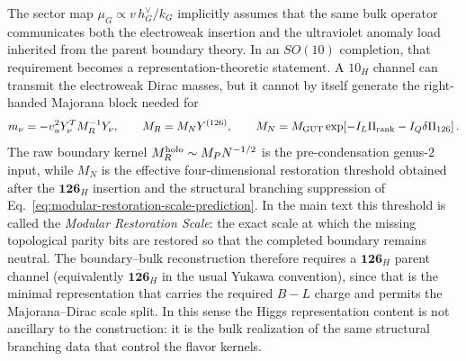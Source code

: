 \documentclass[11pt]{article}
\begin{document}
The sector map $\mu_G\propto v\,h_G^{\vee}/k_G$ implicitly assumes that the same bulk operator communicates both the electroweak insertion and the ultraviolet anomaly load inherited from the parent boundary theory. In an $SO(10)$ completion, that requirement becomes a representation-theoretic statement. A $10_H$ channel can transmit the electroweak Dirac masses, but it cannot by itself generate the right-handed Majorana block needed for
\begin{equation}
 m_{\nu}=-v_u^2Y_{\nu}^{T}M_R^{-1}Y_{\nu},
 \qquad
 M_R = M_NY^{(126)},
 \qquad
 M_N = M_{\rm GUT}\exp\!\left[-I_L\Pi_{\rm rank}-I_Q\delta\Pi_{126}\right].
\end{equation}
The raw boundary kernel $M_R^{\rm holo}\sim M_PN^{-1/2}$ is the pre-condensation genus-$2$ input, while $M_N$ is the effective four-dimensional restoration threshold obtained after the $\mathbf{126}_H$ insertion and the structural branching suppression of Eq.~\eqref{eq:modular-restoration-scale-prediction}. In the main text this threshold is called the \emph{Modular Restoration Scale}: the exact scale at which the missing topological parity bits are restored so that the completed boundary remains neutral. The boundary--bulk reconstruction therefore requires a $\mathbf{126}_H$ parent channel (equivalently $\overline{\mathbf{126}}_H$ in the usual Yukawa convention), since that is the minimal representation that carries the required $B-L$ charge and permits the Majorana--Dirac scale split. In this sense the Higgs representation content is not ancillary to the construction: it is the bulk realization of the same structural branching data that control the flavor kernels.
\end{document}
